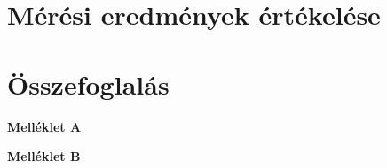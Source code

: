 \documentclass[12pt,a4paper,oneside]{report}
\begin{document}
\chapter{Mérési eredmények értékelése}

\chapter{Összefoglalás}



\footnotesize  %


\newpage

\appendix
{}
\begin{center}
    \Large\textbf{Melléklet A}
\end{center}
%
\newpage

\begin{center}
    \Large\textbf{Melléklet B}
\end{center}
\end{document}
